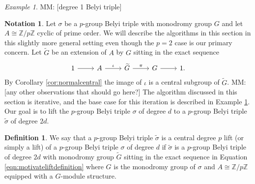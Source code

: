 \documentclass{dcthesis}
\newcommand{\PP}{\mathbb P}
\newcommand{\ZZ}{\mathbb Z}
\newcommand{\defi}[1]{\textsf{#1}}
\newcommand{\mm}[1]{{\color{blue} \sf MM: [#1]}}
\newcommand{\wt}[1]{\widetilde{#1}}
\theoremstyle{definition}
\newtheorem{definition}[prop]{Definition}
\newtheorem{notation}[prop]{Notation}
\theoremstyle{remark}
\newtheorem{example}[prop]{Example}
\numberwithin{equation}{section}
\numberwithin{figure}{section}
\begin{document}
{{    \begin{example}
      \label{exm:degree1belyitriple}
      \mm{degree 1 Belyi triple}
    \end{example}
    \begin{notation}
      \label{not:oursetting}
      Let $\sigma$ be a $p$-group Belyi triple
      with monodromy group $G$
      and
      let $A\cong\ZZ/p\ZZ$
      cyclic of prime order.
      We will describe the algorithms in this
      section in this slightly more general setting
      even though the $p=2$ case is our primary
      concern.
      Let $\wt{G}$ be an extension of $A$
      by $G$ sitting in the exact sequence
      \begin{equation}
        \label{eqn:motivateliftdefinition}
        \begin{tikzcd}
          1\arrow{r}&A\arrow{r}{\iota}
                    &\wt{G}\arrow{r}{\pi}
                    &G\arrow{r}
                    &1.
        \end{tikzcd}
      \end{equation}
      By Corollary \ref{cor:normalcentral}
      the image of $\iota$
      is a central subgroup of $\wt{G}$.
      \mm{any other observations that should go here?}
      The algorithm discussed in this section
      is iterative,
      and the base case for this iteration is described in Example \ref{exm:degree1belyitriple}.
      Our goal is to lift the
      $p$-group Belyi triple
      $\sigma$
      of degree $d$
      to a $p$-group Belyi triple $\wt{\sigma}$
      of degree $2d$.
    \end{notation}
    \begin{definition}
      \label{def:lift}
      We say that a
      $p$-group Belyi
      triple $\wt{\sigma}$
      is a \defi{central degree $p$ lift}
      (or simply a \defi{lift})
      of a $p$-group Belyi triple $\sigma$
      of degree $d$
      if $\wt{\sigma}$ is
      a $p$-group Belyi triple of degree $2d$
      with monodromy group $\wt{G}$
      sitting in the exact sequence
      in
      Equation
      \ref{eqn:motivateliftdefinition}
      where $G$ is the monodromy group of $\sigma$
      and $A\cong\ZZ/p\ZZ$ equipped with a
      $G$-module structure.
    \end{definition}
}}
\end{document}
